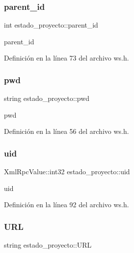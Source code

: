 \subsubsection{\texorpdfstring{parent\+\_\+id}{parent\_id}}
{\footnotesize\ttfamily int estado\+\_\+proyecto\+::parent\+\_\+id}



parent\+\_\+id 



Definición en la línea 73 del archivo ws.\+h.

\hypertarget{classestado__proyecto_a1dd02106c2ec6c2bba1146e0a4871423}{}\label{classestado__proyecto_a1dd02106c2ec6c2bba1146e0a4871423} 
\subsubsection{\texorpdfstring{pwd}{pwd}}
{\footnotesize\ttfamily string estado\+\_\+proyecto\+::pwd}



pwd 



Definición en la línea 56 del archivo ws.\+h.

\hypertarget{classestado__proyecto_adc11a194fc56d3dffdd269dcd090c762}{}\label{classestado__proyecto_adc11a194fc56d3dffdd269dcd090c762} 
\subsubsection{\texorpdfstring{uid}{uid}}
{\footnotesize\ttfamily Xml\+Rpc\+Value\+::int32 estado\+\_\+proyecto\+::uid}



uid 



Definición en la línea 92 del archivo ws.\+h.

\hypertarget{classestado__proyecto_aeadf1825e0dafa90f3c33e88e17d3d1c}{}\label{classestado__proyecto_aeadf1825e0dafa90f3c33e88e17d3d1c} 
\subsubsection{\texorpdfstring{U\+RL}{URL}}
{\footnotesize\ttfamily string estado\+\_\+proyecto\+::\+U\+RL}



